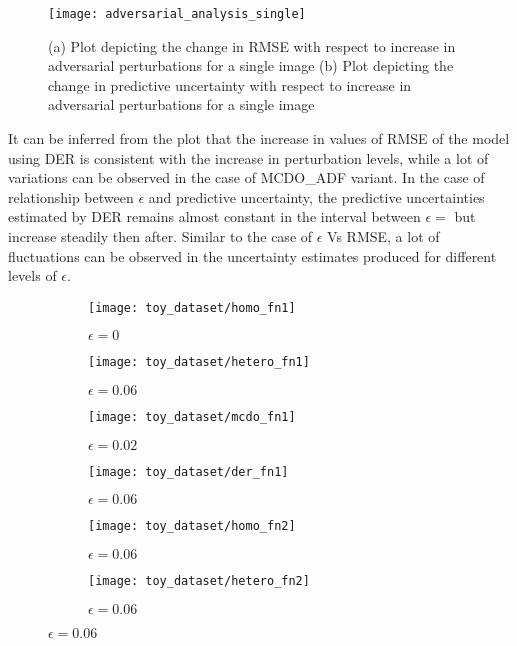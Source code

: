 \begin{figure}[h]
	\centering
	\texttt{[image: adversarial\_analysis\_single]}
	\caption{(a) Plot depicting the change in RMSE with respect to increase in adversarial perturbations for a single image (b) Plot depicting the change in predictive uncertainty with respect to increase in adversarial perturbations for a single image}
	\label{fig_adv_analysis_single}
\end{figure}



It can be inferred from the plot that the increase in values of RMSE of the model using DER is consistent with the increase in perturbation levels, while a lot of variations can be observed in the case of MCDO\_ADF variant. In the case of relationship between $\epsilon$ and predictive uncertainty, the predictive uncertainties estimated by DER remains almost constant in the interval between $\epsilon = $ but increase steadily then after. Similar to the case of $\epsilon$ Vs RMSE, a lot of fluctuations can be observed in the uncertainty estimates produced for different levels of $\epsilon$.

\begin{figure}[h]
	\centering
	\begin{subfigure}[b]{0.4\textwidth}
	\centering
	\texttt{[image: toy\_dataset/homo\_fn1]}
	\caption{$\epsilon=0$}
	\label{fig:y equals x}
	\end{subfigure}
	\hfill
	\begin{subfigure}[b]{0.4\textwidth}
	\centering
	\texttt{[image: toy\_dataset/hetero\_fn1]}
	\caption{$\epsilon=0.06$}
	\label{fig:five over x}
	\end{subfigure}
	\hfill
	\begin{subfigure}[b]{0.4\textwidth}
	\centering
	\texttt{[image: toy\_dataset/mcdo\_fn1]}
	\caption{$\epsilon=0.02$}
	\label{fig:three sin x}
	\end{subfigure}
	\hfill
	\begin{subfigure}[b]{0.4\textwidth}
	\centering
	\texttt{[image: toy\_dataset/der\_fn1]}
	\caption{$\epsilon=0.06$}
	\label{fig:five over x}
	\end{subfigure}
	\hfill
	\begin{subfigure}[b]{0.4\textwidth}
	\centering
	\texttt{[image: toy\_dataset/homo\_fn2]}
	\caption{$\epsilon=0.06$}
	\label{fig:five over x}
	\end{subfigure}
	\hfill
	\begin{subfigure}[b]{0.4\textwidth}
	\centering
	\texttt{[image: toy\_dataset/hetero\_fn2]}
	\caption{$\epsilon=0.06$}
	\label{fig:five over x}
	\end{subfigure}
\end{figure}

